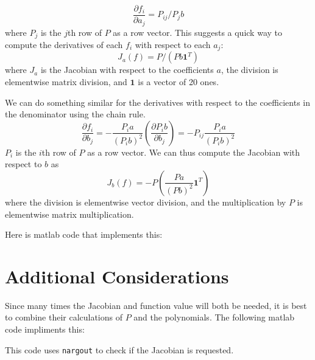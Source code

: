 \documentclass{article}
\begin{document}
  \[
    \dfrac{\partial f_i}{\partial a_j}  = P_{ij}/P_jb
  \]
  where $P_j$ is the $j$th row of $P$ as a row vector. This suggests a quick way to compute the derivatives of each $f_i$ with respect to each $a_j$:
  \[
    J_a(f) = P/(Pb\mathbf{1}^T)
  \]
  where $J_a$ is the Jacobian with respect to the coefficients $a$, the division is elementwise
  matrix division, and $\mathbf{1}$ is a vector of 20 ones.

  We can do something similar for the derivatives with respect to the coefficients in the denominator
  using the chain rule.
  \[
  \dfrac{\partial f_i}{\partial b_j} = -\dfrac{P_ia}{(P_ib)^2}\left(\dfrac{\partial P_ib}{\partial b_j}\right) = -P_{ij}\dfrac{P_ia}{(P_ib)^2}
  \]
  $P_i$ is the $i$th row of $P$ as a row vector. We can thus compute the Jacobian with respect to $b$ as
  \[
    J_b(f) = -P\left(\dfrac{Pa}{(Pb)^2}\mathbf{1}^T\right)
  \]
  where the division is elementwise vector division, and the multiplication by $P$ is elementwise
  matrix multiplication.
  
  Here is matlab code that implements this: 
  
  \section{Additional Considerations}
  Since many times the Jacobian and function value will both be needed, it is best to combine
  their calculations of $P$ and the polynomials. The following matlab code impliments this:
  
  This code uses \verb|nargout| to check if the Jacobian is requested. 
\end{document}
